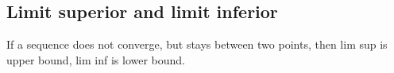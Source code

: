 
\subsection{Limit superior and limit inferior}

If a sequence does not converge, but stays between two points, then lim sup is upper bound, lim inf is lower bound.

